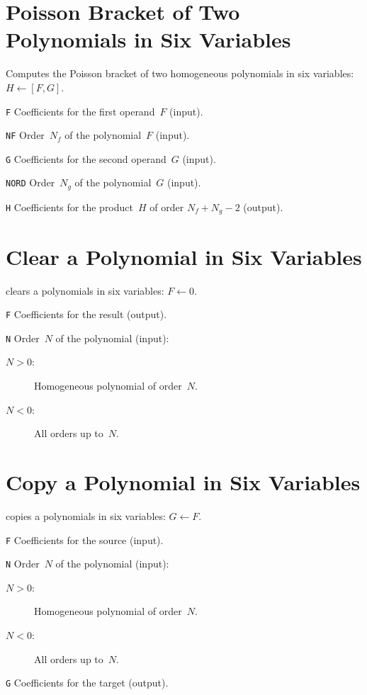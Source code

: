 \section{Poisson Bracket of Two Polynomials in Six Variables}
\label{PA6BRK}
Computes the Poisson bracket of two homogeneous polynomials in six
variables: $H \leftarrow [F,G]$.
\begin{mylist}
\item[\tt F]
Coefficients for the first operand~$F$ (input).
\item[\tt NF]
Order~$N_f$ of the polynomial~$F$ (input).
\item[\tt G]
Coefficients for the second operand~$G$ (input).
\item[\tt NORD]
Order~$N_g$ of the polynomial~$G$ (input).
\item[\tt H]
Coefficients for the product~$H$ of order $N_f + N_g - 2$ (output).
\end{mylist}

\section{Clear a Polynomial in Six Variables}
\label{PA6CLR}
clears a polynomials in six variables: $F \leftarrow 0$.
\begin{mylist}
\item[\tt F]
Coefficients for the result (output).
\item[\tt N]
Order~$N$ of the polynomial (input):
\begin{description}
\item[$N > 0$:] Homogeneous polynomial of order~$N$.
\item[$N < 0$:] All orders up to~$N$.
\end{description}
\end{mylist}

\section{Copy a Polynomial in Six Variables}
\label{PA6CPY}
copies a polynomials in six variables: $G \leftarrow F$.
\begin{mylist}
\item[\tt F]
Coefficients for the source (input).
\item[\tt N]
Order~$N$ of the polynomial (input):
\begin{description}
\item[$N > 0$:] Homogeneous polynomial of order~$N$.
\item[$N < 0$:] All orders up to~$N$.
\end{description}
\item[\tt G]
Coefficients for the target (output).
\end{mylist}

